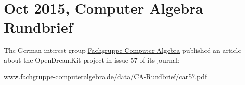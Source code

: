 \documentclass{deliverablereport}
\begin{document}
\clearpage

\section{Oct 2015, Computer Algebra Rundbrief}

The German interest group
\href{http://www.fachgruppe-computeralgebra.de/}{Fachgruppe Computer
  Algebra} published an article about the OpenDreamKit project in
issue 57 of its journal:

{\scriptsize \url{www.fachgruppe-computeralgebra.de/data/CA-Rundbrief/car57.pdf}}

\medskip
\end{document}
